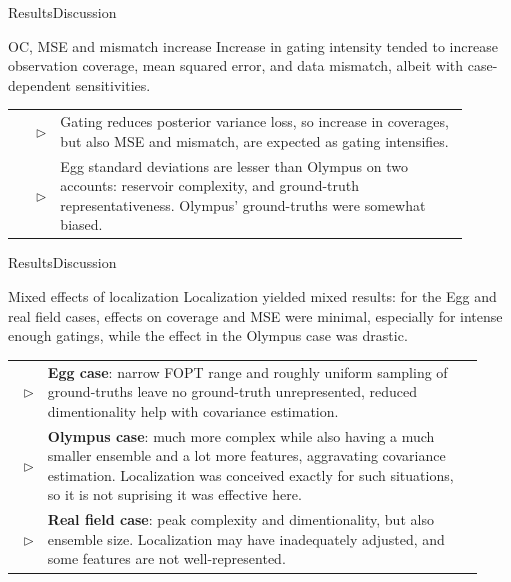 \begin{frame}{Results}{Discussion}
    \begin{block}{OC, MSE and mismatch increase}
        Increase in gating intensity tended to increase 
        observation coverage, mean squared error, and data mismatch,
        albeit with case-dependent sensitivities.
    \end{block}
    \vfill
    \def\arraystretch{2}
    \begin{tabular}{rp{0.9\linewidth}}
        $\triangleright$ & Gating reduces posterior variance loss, so increase in coverages, but also MSE and mismatch, are expected as gating intensifies.
    \\
        $\triangleright$ & Egg standard deviations are lesser than Olympus on two accounts:
        reservoir complexity, and ground-truth representativeness. Olympus' ground-truths were somewhat biased.
    \end{tabular}
    \vfill
\end{frame}

\begin{frame}{Results}{Discussion}
    \begin{block}{Mixed effects of localization}
        Localization yielded mixed results: for the Egg and real field cases,
        effects on coverage and MSE were minimal, especially for intense enough gatings,
        while the effect in the Olympus case was drastic.
    \end{block}
    \vfill
    \def\arraystretch{1.75}
    \begin{tabular}{rp{0.93\linewidth}}
        $\triangleright$ & 
        \textbf{Egg case}:
            narrow FOPT range and roughly uniform sampling of ground-truths leave no ground-truth unrepresented,
            reduced dimentionality help with covariance estimation.
    \\
        $\triangleright$ &
        \textbf{Olympus case}:
            much more complex while also having a much smaller ensemble
            and a lot more features, aggravating covariance estimation.
            Localization was conceived exactly for such situations, so it is not suprising it was effective here.
    \\
        $\triangleright$ &
        \textbf{Real field case}:
            peak complexity and dimentionality, but also ensemble size.
            Localization may have inadequately adjusted, and some features are not well-represented.
    \end{tabular}
\end{frame}

